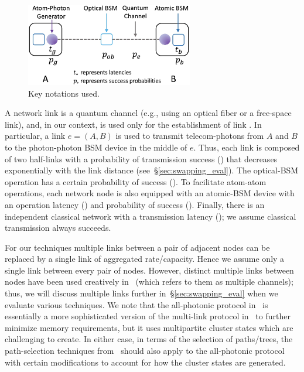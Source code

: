 \begin{figure}
    \centering
    \includegraphics[width=0.65\textwidth]{chapters/tqe/figures/notation_link.jpg}
  \vspace{0.3cm}
  \caption{Key notations used.}
  \label{fig:swapping_notation_link}
\end{figure}
A network link is a quantum channel (e.g., using an 
optical fiber or a free-space link),
and, in our context, is used only for the establishment 
of link \eps.
In particular, a link $e=(A,B)$ is used to transmit telecom-photons 
from $A$ and $B$
to the photon-photon BSM device in the middle of $e$.
Thus, each link is composed of two 
half-links with a probability of transmission success (\ep) that decreases exponentially with the link distance (see~\S\ref{sec:swapping_eval}).
The optical-BSM operation has 
a certain probability of success (\php).
To facilitate atom-atom \es operations, each network node is also equipped 
with an atomic-BSM device 
with an operation latency (\bt) and probability of success (\bp). Finally, 
there is an independent classical network with a transmission latency (\ct);
we assume classical transmission  
always succeeds.

   For our techniques multiple links between a pair of adjacent nodes can be replaced by a single link of aggregated
rate/capacity.  Hence we
assume only a single link between every pair of nodes. However, 
distinct multiple links between nodes have been used creatively
in~\cite{sigcomm20} (which refers to them as multiple channels); thus, we will 
discuss multiple links further in~\S\ref{sec:swapping_eval} when we evaluate various techniques. 
We note that the all-photonic protocol in~\cite{all-photo-15} is essentially a more sophisticated version of the multi-link \os protocol in~\cite{sigcomm20} to further
minimize memory requirements, but it uses multipartite cluster states which are
challenging to create. In either case, in terms of the selection of paths/trees,
the path-selection techniques from~\cite{sigcomm20} should also apply to the all-photonic protocol with certain modifications to account for 
how the cluster states are generated.

